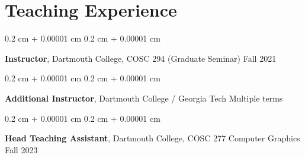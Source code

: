 \documentclass[10pt, letterpaper]{article}
\newenvironment{onecolentry}{
    \begin{adjustwidth}{
        0.2 cm + 0.00001 cm
    }{
        0.2 cm + 0.00001 cm
    }
}{
    \end{adjustwidth}
} %
\begin{document}
        \section{Teaching Experience}
        
        \begin{onecolentry}
        \textbf{Instructor}, Dartmouth College, COSC 294 (Graduate Seminar) \hfill Fall 2021
        \end{onecolentry}

        \begin{onecolentry}
        \textbf{Additional Instructor}, Dartmouth College / Georgia Tech \hfill Multiple terms
        \end{onecolentry}
        
        \begin{onecolentry}
        \textbf{Head Teaching Assistant}, Dartmouth College, COSC 277 Computer Graphics \hfill Fall 2023
        \end{onecolentry}


    
    
\end{document}
